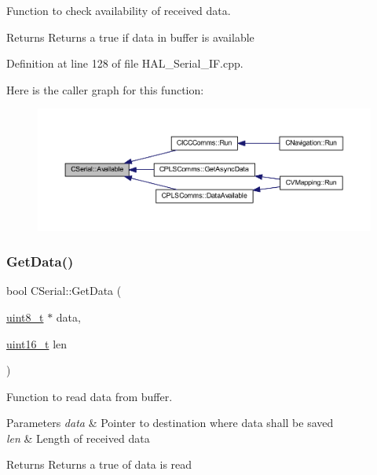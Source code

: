 Function to check availability of received data. 

\begin{DoxyReturn}{Returns}
Returns a true if data in buffer is available 
\end{DoxyReturn}


Definition at line 128 of file H\+A\+L\+\_\+\+Serial\+\_\+\+I\+F.\+cpp.

Here is the caller graph for this function\+:
\nopagebreak
\begin{figure}[H]
\begin{center}
\leavevmode
\includegraphics[width=350pt]{class_c_serial_abb43734223d937a86e7616636ea16024_icgraph}
\end{center}
\end{figure}
\mbox{\label{class_c_serial_abad86c07f530569b2ceeea75bda485ad}} 
\subsubsection{\texorpdfstring{Get\+Data()}{GetData()}}
{\footnotesize\ttfamily bool C\+Serial\+::\+Get\+Data (\begin{DoxyParamCaption}\item[{\mbox{\hyperlink{_a_d_a_s___types_8h_aba7bc1797add20fe3efdf37ced1182c5}{uint8\+\_\+t}} $\ast$}]{data,  }\item[{\mbox{\hyperlink{_a_d_a_s___types_8h_a1f1825b69244eb3ad2c7165ddc99c956}{uint16\+\_\+t}}}]{len }\end{DoxyParamCaption})}



Function to read data from buffer. 


\begin{DoxyParams}{Parameters}
{\em data} & Pointer to destination where data shall be saved \\
\hline
{\em len} & Length of received data \\
\hline
\end{DoxyParams}
\begin{DoxyReturn}{Returns}
Returns a true of data is read 
\end{DoxyReturn}


